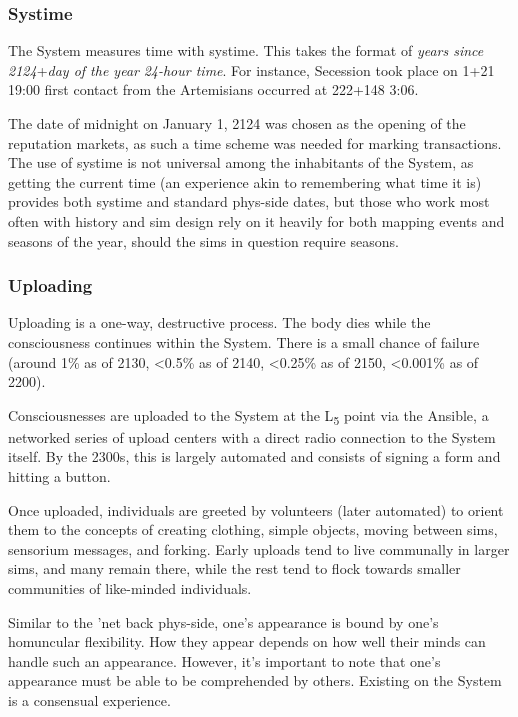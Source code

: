 \subsubsection{Systime}

The System measures time with systime. This takes the format of \emph{years since 2124}+\emph{day of the year} \emph{24-hour time}. For instance, Secession took place on 1+21 19:00 first contact from the Artemisians occurred at 222+148 3:06.

The date of midnight on January 1, 2124 was chosen as the opening of the reputation markets, as such a time scheme was needed for marking transactions. The use of systime is not universal among the inhabitants of the System, as getting the current time (an experience akin to remembering what time it is) provides both systime and standard phys-side dates, but those who work most often with history and sim design rely on it heavily for both mapping events and seasons of the year, should the sims in question require seasons.

\subsubsection{Uploading}

Uploading is a one-way, destructive process. The body dies while the consciousness continues within the System. There is a small chance of failure (around 1\% as of 2130, \textless0.5\% as of 2140, \textless0.25\% as of 2150, \textless0.001\% as of 2200).

Consciousnesses are uploaded to the System at the L\textsubscript{5} point via the Ansible, a networked series of upload centers with a direct radio connection to the System itself. By the 2300s, this is largely automated and consists of signing a form and hitting a button.

Once uploaded, individuals are greeted by volunteers (later automated) to orient them to the concepts of creating clothing, simple objects, moving between sims, sensorium messages, and forking. Early uploads tend to live communally in larger sims, and many remain there, while the rest tend to flock towards smaller communities of like-minded individuals.

Similar to the 'net back phys-side, one's appearance is bound by one's homuncular flexibility. How they appear depends on how well their minds can handle such an appearance. However, it's important to note that one's appearance must be able to be comprehended by others. Existing on the System is a consensual experience.

